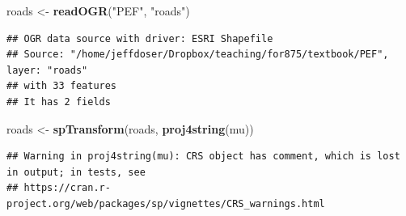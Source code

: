 \documentclass[
]{krantz}
\newenvironment{Shaded}{\begin{snugshade}}{\end{snugshade}}
\newcommand{\KeywordTok}[1]{\textcolor[rgb]{0.13,0.29,0.53}{\textbf{#1}}}
\newcommand{\NormalTok}[1]{#1}
\newcommand{\StringTok}[1]{\textcolor[rgb]{0.31,0.60,0.02}{#1}}
\begin{document}
\begin{Shaded}
\begin{Highlighting}[]
\NormalTok{roads \textless{}{-}}\StringTok{ }\KeywordTok{readOGR}\NormalTok{(}\StringTok{"PEF"}\NormalTok{, }\StringTok{"roads"}\NormalTok{)}
\end{Highlighting}
\end{Shaded}

\begin{verbatim}
## OGR data source with driver: ESRI Shapefile 
## Source: "/home/jeffdoser/Dropbox/teaching/for875/textbook/PEF", layer: "roads"
## with 33 features
## It has 2 fields
\end{verbatim}

\begin{Shaded}
\begin{Highlighting}[]
\NormalTok{roads \textless{}{-}}\StringTok{ }\KeywordTok{spTransform}\NormalTok{(roads, }\KeywordTok{proj4string}\NormalTok{(mu))}
\end{Highlighting}
\end{Shaded}

\begin{verbatim}
## Warning in proj4string(mu): CRS object has comment, which is lost in output; in tests, see
## https://cran.r-project.org/web/packages/sp/vignettes/CRS_warnings.html
\end{verbatim}
\end{document}

